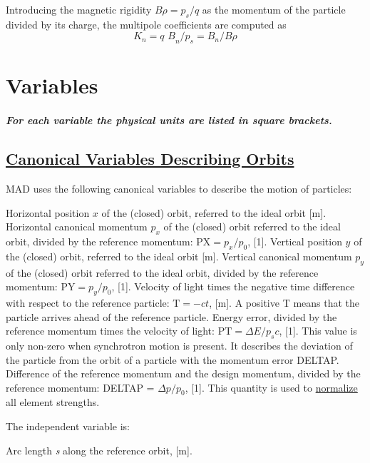 Introducing the magnetic rigidity \(\textit{B}\rho = p_s / q\) as the
momentum of the particle divided by its charge, the multipole
coefficients are computed as
\[ \textit{K}_n = \textit{q B}_n / \textit{p}_s  =  \textit{B}_n / \textit{B} \rho \] 




\section{Variables}
\label{sec:variables}
\subparagraph{ For each variable the physical units are listed in square brackets. }

\subsection{\href{canon}{Canonical Variables Describing Orbits}} 
\label{subsec:tables_canon}
MAD uses the following canonical variables to describe the motion of particles: 
\begin{madlist}
    Horizontal position $x$ of the (closed) orbit,
     referred to the ideal orbit [m].    
    Horizontal canonical momentum $p_x$ of the
     (closed) orbit referred to the ideal orbit, divided by the
     reference momentum: $\textrm{PX} = p_x / p_0$, [1].   
    Vertical position $y$ of the (closed) orbit, referred
     to the ideal orbit [m].   
    Vertical canonical momentum $p_y$ of the (closed)
     orbit referred to the ideal orbit, divided by the reference
     momentum: $\textrm{PY} = p_y / p_0$, [1].   
    Velocity of light times the negative time difference with
     respect to the reference particle: $\textrm{T} =  - c t$, [m]. A
     positive T means that the particle arrives ahead of the reference
     particle.   
    Energy error, divided by the reference momentum times the
     velocity of light: $\textrm{PT} = \Delta E / p_s c$, [1]. 
     This value is only non-zero when synchrotron motion is
     present. It describes the deviation of the particle from the orbit
     of a particle with the momentum error DELTAP.   
    Difference of the reference momentum and the design
     momentum, divided by the reference momentum: DELTAP =
     $\Delta p / p_0$, [1]. This quantity is used to
     \href{defects.html}{normalize} all element strengths.   
\end{madlist} 

The independent variable is: 
\begin{madlist}
    Arc length \textit{s} along the reference orbit, [m].   
\end{madlist} 

